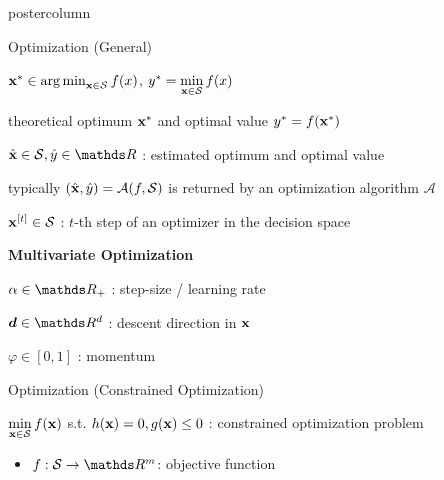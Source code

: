 \documentclass{beamer}
\begin{document}
\begin{frame}[fragile]{}
\begin{columns}
\begin{column}{.31\textwidth}
\begin{beamercolorbox}[center]{postercolumn}
\begin{minipage}{.98\textwidth}
{\begin{myblock}{Optimization (General)}
						\hspace*{1ex}			
						\begin{codebox}
							 $\mathbf{x}^\ast \in \operatorname{arg\,min}\limits_{\mathbf{x} \in \mathcal{S}} f(x)$, $y^\ast = \min\limits_{\mathbf{x} \in \mathcal{S}} f(x)$
						\end{codebox}
						\hspace*{1ex} theoretical optimum $\mathbf{x}^\ast$ and optimal value $y^\ast = f(\mathbf{x}^\ast)$ \\
						\begin{codebox}
							 $\hat\xv \in \mathcal{S}, \hat y \in \R$ : estimated optimum and optimal value
						\end{codebox}
						\hspace*{1ex} typically $(\hat{\mathbf{x}}, \hat y) = \mathcal{A}(f,\mathcal{S})$ is returned by an optimization algorithm $\mathcal{A}$ \\
						\begin{codebox}
							 $\mathbf{x}^{[t]} \in \mathcal{S}$ : $t$-th step of an optimizer in the decision space
						\end{codebox}
						\vspace*{2ex} \textbf{Multivariate Optimization}\\
							\begin{codebox}
								 $\alpha \in \R_+$ : step-size / learning rate
							\end{codebox}
							\hspace*{1ex}
							\begin{codebox}
								 $\bm{d} \in \R^d$ : descent direction in $\mathbf{x}$
							\end{codebox}
							\hspace*{1ex}
							\begin{codebox}
								 $\varphi \in [0, 1]$ : momentum
							\end{codebox}
						\end{myblock}	
					\begin{myblock}{Optimization (Constrained Optimization)}
					\begin{codebox}
							$\min\limits_{\mathbf{x} \in \mathcal{S}} f(\mathbf{x})$ s.t. $h(\mathbf{x}) = 0, g(\mathbf{x}) \le 0$ : constrained optimization problem
						\end{codebox}
						\begin{itemize}
							\item \quad $f: \mathcal{S} \to \R^m$: objective function

\end{itemize}
\end{myblock}}
\end{minipage}
\end{beamercolorbox}
\end{column}
\end{columns}
\end{frame}
\end{document}
